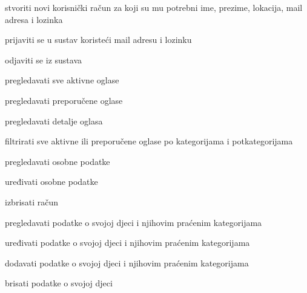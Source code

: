 			
			\begin{packed_enum}
			
				\item  {}
				
				\begin{packed_enum}
					\item stvoriti novi korisnički račun za koji su mu potrebni ime, prezime, lokacija, mail adresa i lozinka
					\item prijaviti se u sustav koristeći mail adresu i lozinku
					\item odjaviti se iz sustava
					\item pregledavati sve aktivne oglase
					\item pregledavati preporučene oglase
					\item pregledavati detalje oglasa
					\item filtrirati sve aktivne ili preporučene oglase po kategorijama i potkategorijama
					\item pregledavati osobne podatke
					\item uređivati osobne podatke
					\item izbrisati račun
					\item pregledavati podatke o svojoj djeci i njihovim praćenim kategorijama
					\item uređivati podatke o svojoj djeci i njihovim praćenim kategorijama
					\item dodavati podatke o svojoj djeci i njihovim praćenim kategorijama
					\item brisati podatke o svojoj djeci	
					
				\end{packed_enum}

				\eject

				\item  {}
				

\end{packed_enum}
